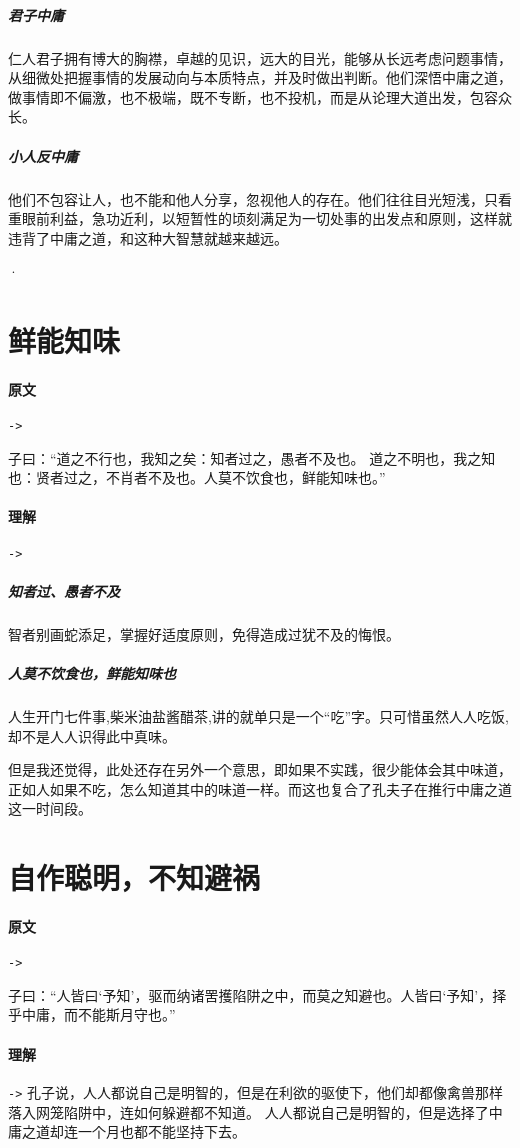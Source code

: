 \documentclass[UTF8,a4paper,8pt]{ctexbook}
\begin{document}
				\subparagraph{君子中庸}仁人君子拥有博大的胸襟，卓越的见识，远大的目光，能够从长远考虑问题事情，从细微处把握事情的发展动向与本质特点，并及时做出判断。他们深悟中庸之道，做事情即不偏激，也不极端，既不专断，也不投机，而是从论理大道出发，包容众长。
				
				\subparagraph{小人反中庸}他们不包容让人，也不能和他人分享，忽视他人的存在。他们往往目光短浅，只看重眼前利益，急功近利，以短暂性的顷刻满足为一切处事的出发点和原则，这样就违背了中庸之道，和这种大智慧就越来越远。
				
·		\section{鲜能知味}
			\paragraph{原文}\verb|->|
				
				子曰：“道之不行也，我知之矣：知者过之，愚者不及也。 道之不明也，我之知也：贤者过之，不肖者不及也。人莫不饮食也，鲜能知味也。”
				
			\paragraph{理解}\verb|->|
			
				\subparagraph{知者过、愚者不及}智者别画蛇添足，掌握好适度原则，免得造成过犹不及的悔恨。
				
				\subparagraph{人莫不饮食也，鲜能知味也} 人生开门七件事,柴米油盐酱醋茶,讲的就单只是一个“吃”字。只可惜虽然人人吃饭,却不是人人识得此中真味。
				
				但是我还觉得，此处还存在另外一个意思，即如果不实践，很少能体会其中味道，正如人如果不吃，怎么知道其中的味道一样。而这也复合了孔夫子在推行中庸之道这一时间段。
	
	\section{自作聪明，不知避祸}
			\paragraph{原文}\verb|->|
					
				子曰：“人皆曰‘予知’，驱而纳诸罟擭陷阱之中，而莫之知避也。人皆曰‘予知’，择乎中庸，而不能斯月守也。”
			\paragraph{理解}\verb|->|
				孔子说，人人都说自己是明智的，但是在利欲的驱使下，他们却都像禽兽那样落入网笼陷阱中，连如何躲避都不知道。
				人人都说自己是明智的，但是选择了中庸之道却连一个月也都不能坚持下去。
			
\end{document}
